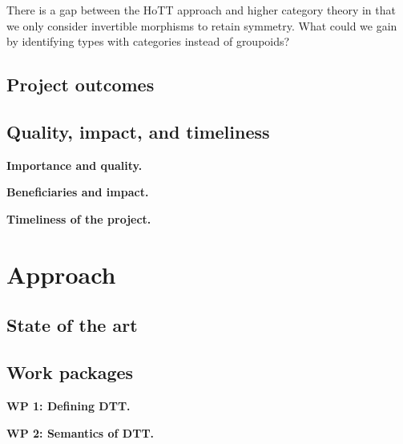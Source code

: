 \documentclass[a4paper,11pt]{article}
\renewcommand{\paragraph}[1]{\textbf{#1.}}
\begin{document}
There is a gap between the HoTT approach and higher category theory in
that we only consider invertible morphisms to retain symmetry. What
could we gain by identifying types with categories instead of
groupoids?  


\subsection{Project outcomes}\label{project-outcomes}



\subsection{Quality, impact, and timeliness}

\paragraph{Importance and quality} %

\paragraph{Beneficiaries and impact}

\paragraph{Timeliness of the project}

\section{Approach} %


\subsection{State of the art}\label{state-of-the-art}


\subsection{Work packages}\label{work-packages}

\paragraph{WP 1: Defining DTT}

\paragraph{WP 2: Semantics of DTT}
\end{document}
